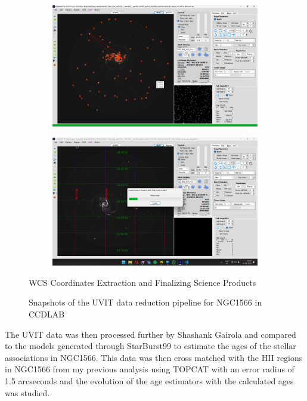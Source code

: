 \documentclass[12pt]{report}
\begin{document}
\begin{figure}[htbp]
    \begin{subfigure}{0.45\textwidth}
        \centering
        \includegraphics[width=\linewidth]{image32.png}
        \label{fig:image32}
    \end{subfigure}
    \hfill
    \begin{subfigure}{0.45\textwidth}
        \centering
        \includegraphics[width=\linewidth]{image34.png}
        \label{fig:image34}
    \end{subfigure}
    \caption*{WCS Coordinates Extraction and Finalizing Science Products}

    \small
    \caption{Snapshots of the UVIT data reduction pipeline for NGC1566 in CCDLAB}
    \label{fig:UVIT_pipeline}

\end{figure}




The UVIT data was then processed further by Shashank Gairola and compared to the models generated through StarBurst99 to estimate the ages of the stellar associations in NGC1566. This data was then cross matched with the HII regions in NGC1566 from my previous analysis using TOPCAT with an error radius of 1.5 arcseconds and the evolution of the age estimators with the calculated ages was studied.
\end{document}
